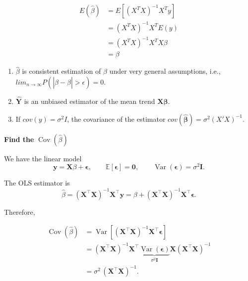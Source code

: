 \documentclass[
  letterpaper,
  DIV=11,
  numbers=noendperiod]{scrreprt}
\begin{document}
\[
\begin{align}
E(\hat{\beta}) & = E[(X^TX)^{-1} X^Ty]\\
& = (X^T X)^{-1} X^T E(y)\\
& =(X^T X)^{-1} X^T X \beta\\
& = \beta
\end{align}
\]

\begin{enumerate}
\def\labelenumi{\arabic{enumi}.}
\setcounter{enumi}{1}
\item
  \(\hat{\beta}\) is consistent estimation of \(\beta\) under very
  general assumptions, i.e.,
  \(lim_{n\rightarrow \infty} P(|\hat{\beta} - \beta|>\epsilon) = 0\).
\item
  \(\mathbf{\hat{Y}}\) is an unbiased estimator of the mean trend
  \(\mathbf{X\beta}\).
\item
  If \(cov(y) = \sigma^2 I\), the covariance of the estimator
  \(cov(\mathbf{\hat{\beta}}) = \sigma^2 (X'X)^{-1}\).
\end{enumerate}

\textbf{Find the} \(\operatorname{Cov}(\hat{\beta})\)

We have the linear model \[
\mathbf{y} = \mathbf{X}\beta + \boldsymbol{\epsilon}, 
\qquad \mathbb{E}[\boldsymbol{\epsilon}] = \mathbf{0}, 
\qquad \operatorname{Var}(\boldsymbol{\epsilon}) = \sigma^2 \mathbf{I}.
\]

The OLS estimator is \[
\hat{\beta} = (\mathbf{X}^\top \mathbf{X})^{-1}\mathbf{X}^\top \mathbf{y}
= \beta + (\mathbf{X}^\top \mathbf{X})^{-1}\mathbf{X}^\top \boldsymbol{\epsilon}.
\]

Therefore,

\[
\begin{aligned}
\operatorname{Cov}(\hat{\beta})
&= \operatorname{Var}\!\left[(\mathbf{X}^\top \mathbf{X})^{-1}\mathbf{X}^\top \boldsymbol{\epsilon}\right] \\
&= (\mathbf{X}^\top \mathbf{X})^{-1}\mathbf{X}^\top 
      \underbrace{\operatorname{Var}(\boldsymbol{\epsilon})}_{\sigma^2 \mathbf{I}}
      \mathbf{X}(\mathbf{X}^\top \mathbf{X})^{-1} \\
&= \sigma^2 \, (\mathbf{X}^\top \mathbf{X})^{-1}.
\end{aligned}
\]
\end{document}

